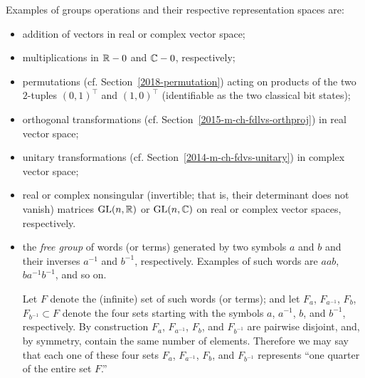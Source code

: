 {
\color{blue}
\bexample
Examples of groups operations and their respective representation spaces are:
\begin{itemize}
\item
addition of vectors in real or complex vector space;

\item
multiplications in ${\Bbb R} - {0}$ and ${\Bbb C} - {0}$, respectively;

\item
permutations (cf. Section~\ref{2018-permutation})
acting on products of the two $2$-tuples
$(0,1)^\intercal $ and
$(1,0)^\intercal $
(identifiable as the two classical bit states\cite{mermin-07});


\item
orthogonal transformations
 (cf. Section~\ref{2015-m-ch-fdlvs-orthproj})
in real  vector space;

\item
unitary transformations
 (cf. Section~\ref{2014-m-ch-fdvs-unitary})
in  complex vector space;

\item
real or complex nonsingular (invertible; that is, their determinant does not vanish)
matrices $\textrm{GL}(n,{\Bbb R})$ or $\textrm{GL}(n,{\Bbb C})$ on real or complex vector spaces, respectively.

\item
the {\em free group}
of words (or terms) generated by two symbols $a$ and $b$ and their
inverses $a^{-1}$ and $b^{-1}$,
respectively. Examples of such words are $aab$, $ba^{-1}b^{-1}$, and so on.


Let $F$ denote the (infinite) set of such words (or terms);
and let $F_a$,
$F_{a^{-1}}$,
$F_b$,
$F_{b^{-1}}\subset F$
denote the four sets starting with the symbols
$a$, $a^{-1}$,
$b$, and $b^{-1}$,
respectively.
%
By construction
$F_a$,
$F_{a^{-1}}$,
$F_b$, and
$F_{b^{-1}}$
are pairwise disjoint,
and, by symmetry, contain the same number of elements.
Therefore we may say that each one of these four sets
$F_a$,
$F_{a^{-1}}$,
$F_b$,  and
$F_{b^{-1}}$
represents ``one quarter of the entire set $F$.''


\end{itemize}}
